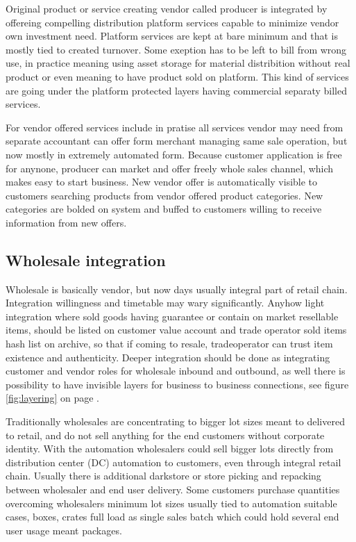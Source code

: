 Original product or service creating vendor called producer is integrated by
offereing compelling distribution platform services capable to minimize vendor
own investment need. Platform services are kept at bare minimum and that is
mostly tied to created turnover. Some exeption has to be left to bill from
wrong use, in practice meaning using asset storage for material distribition
without real product or even meaning to have product sold on platform. This
kind of services are going under the platform protected layers having
commercial separaty billed services.

For vendor offered services include in pratise all services vendor may need
from separate accountant can offer form merchant managing same sale operation,
but now mostly in extremely automated form. Because customer application is
free for anynone, producer can market and offer freely whole sales channel,
which makes easy to start business. New vendor offer is automatically visible
to customers searching products from vendor offered product categories. New
categories are bolded on system and buffed to customers willing to receive
information from new offers.

\subsection{Wholesale integration}
\label{wholesale}
Wholesale is basically vendor, but now days usually integral part of retail
chain. Integration willingness and timetable may wary significantly. Anyhow
light integration where sold goods having guarantee or contain on market
resellable items, should be listed on customer value account and trade
operator sold items hash list on archive, so that if coming to resale,
tradeoperator can trust item existence and authenticity. Deeper integration
should be done as integrating customer and vendor roles for wholesale inbound
and outbound, as well there is possibility to have invisible layers for
business to business connections, see figure \ref{fig:layering} on page
\pageref{fig:layering}.

Traditionally wholesales are concentrating to bigger lot sizes meant to
delivered to retail, and do not sell anything for the end customers without
corporate identity. With the automation wholesalers could sell bigger lots
directly from distribution center (DC) automation to customers, even through
integral retail chain. Usually there is additional darkstore or store picking
and repacking between wholesaler and end user delivery. Some customers
purchase quantities overcoming wholesalers minimum lot sizes usually tied to
automation suitable cases, boxes, crates full load as single sales batch which
could hold several end user usage meant packages.

